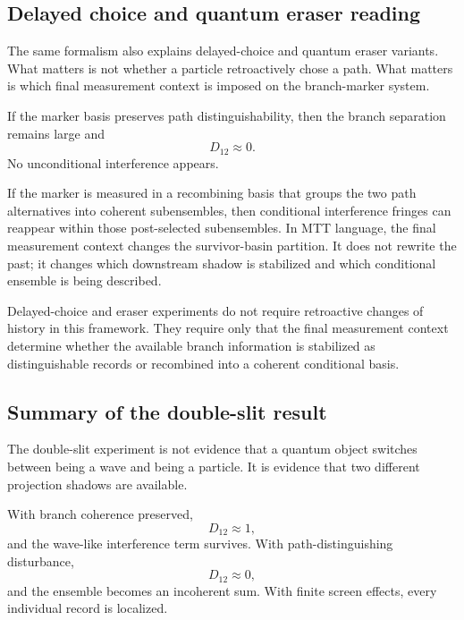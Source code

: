 \documentclass[11pt]{article}
\begin{document}
\subsection{Delayed choice and quantum eraser reading}
\label{subsec:delayed-choice-eraser}

The same formalism also explains delayed-choice and quantum eraser variants. What matters
is not whether a particle retroactively chose a path. What matters is which final measurement
context is imposed on the branch-marker system.

If the marker basis preserves path distinguishability, then the branch separation remains
large and
\begin{equation}
  D_{12}\approx0.
\end{equation}
No unconditional interference appears.

If the marker is measured in a recombining basis that groups the two path alternatives into
coherent subensembles, then conditional interference fringes can reappear within those
post-selected subensembles. In MTT language, the final measurement context changes the
survivor-basin partition. It does not rewrite the past; it changes which downstream shadow
is stabilized and which conditional ensemble is being described.

\begin{remark}
\label{rem:no-retrocausality}
Delayed-choice and eraser experiments do not require retroactive changes of history in this
framework. They require only that the final measurement context determine whether the
available branch information is stabilized as distinguishable records or recombined into a
coherent conditional basis.
\end{remark}

\subsection{Summary of the double-slit result}
\label{subsec:double-slit-summary}

The double-slit experiment is not evidence that a quantum object switches between being a
wave and being a particle. It is evidence that two different projection shadows are available.

With branch coherence preserved,
\begin{equation}
  D_{12}\approx1,
\end{equation}
and the wave-like interference term survives. With path-distinguishing disturbance,
\begin{equation}
  D_{12}\approx0,
\end{equation}
and the ensemble becomes an incoherent sum. With finite screen effects, every individual
record is localized.
\end{document}
